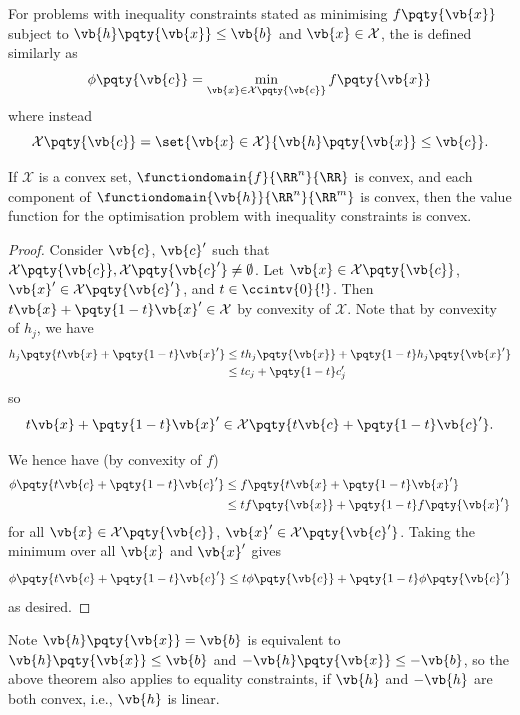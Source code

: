 For problems with inequality constraints stated as minimising \(f\pqty{\vb{x}}\) subject to \(\vb{h}\pqty{\vb{x}} \leq \vb{b}\) and \(\vb{x} \in \mathcal{X}\), the  is defined similarly as
\[
    \phi\pqty{\vb{c}} = \min_{\vb{x} \in \mathcal{X} \pqty{\vb{c}}} f\pqty{\vb{x}}
\]
where instead
\[
    \mathcal{X} \pqty{\vb{c}} = \set{\vb{x} \in \mathcal{X}}{\vb{h}\pqty{\vb{x}} \leq \vb{c}}.
\]

\begin{theorem}
    If \(\mathcal{X}\) is a convex set, \(\functiondomain{f}{\RR^n}{\RR}\) is convex, and each component of \(\functiondomain{\vb{h}}{\RR^n}{\RR^m}\) is convex, then the value function for the optimisation problem with inequality constraints is convex.
\end{theorem}

\begin{proof}
    Consider \(\vb{c}\), \(\vb{c}'\) such that \(\mathcal{X} \pqty{\vb{c}}, \mathcal{X} \pqty{\vb{c}'} \neq \emptyset\). Let \(\vb{x} \in \mathcal{X}\pqty{\vb{c}}\), \(\vb{x}' \in \mathcal{X}\pqty{\vb{c}'}\), and \(t \in \ccintv{0}{!}\). Then \(t \vb{x} + \pqty{1 - t} \vb{x}' \in \mathcal{X}\) by convexity of \(\mathcal{X}\). Note that by convexity of \(h_j\), we have
    \begin{align*}
        h_j\pqty{t \vb{x} + \pqty{1 - t} \vb{x}'} &\leq t h_j\pqty{\vb{x}} + \pqty{1 - t} h_j\pqty{\vb{x}'} \\
        &\leq t c_j + \pqty{1 - t} c_j'
    \end{align*}
    so
    \[
        t \vb{x} + \pqty{1 - t} \vb{x}' \in \mathcal{X} \pqty{t \vb{c} + \pqty{1 - t} \vb{c}'}.
    \]

    We hence have (by convexity of \(f\))
    \begin{align*}
        \phi\pqty{t \vb{c} + \pqty{1 - t} \vb{c}'} &\leq f\pqty{t \vb{x} + \pqty{1 - t} \vb{x}'} \\
        &\leq t f\pqty{\vb{x}} + \pqty{1 - t} f\pqty{\vb{x}'}
    \end{align*}
    for all \(\vb{x} \in \mathcal{X}\pqty{\vb{c}}\), \(\vb{x}' \in \mathcal{X}\pqty{\vb{c}'}\). Taking the minimum over all \(\vb{x}\) and \(\vb{x}'\) gives
    \[
        \phi\pqty{t \vb{c} + \pqty{1 - t} \vb{c}'} \leq t \phi\pqty{\vb{c}} + \pqty{1 - t} \phi\pqty{\vb{c}'}
    \]
    as desired.
\end{proof}

Note \(\vb{h}\pqty{\vb{x}} = \vb{b}\) is equivalent to \(\vb{h}\pqty{\vb{x}} \leq \vb{b}\) and \(- \vb{h}\pqty{\vb{x}} \leq - \vb{b}\), so the above theorem also applies to equality constraints, if \(\vb{h}\) and \(-\vb{h}\) are both convex, i.e., \(\vb{h}\) is linear.